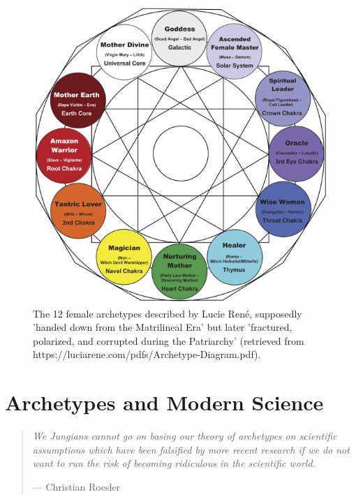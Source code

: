 \documentclass[
]{book}
\begin{document}
\begin{figure}

{\centering \includegraphics[width=\textwidth]{img/female_archetypes} 

}

\caption{The 12 female archetypes described by Lucie René, supposedly 'handed down from the Matrilineal Era' but later 'fractured, polarized, and corrupted during the Patriarchy' (retrieved from https://luciarene.com/pdfs/Archetype-Diagram.pdf).}\label{fig:unnamed-chunk-12}
\end{figure}

\hypertarget{archetypes-and-modern-science}{%
\chapter{Archetypes and Modern Science}\label{archetypes-and-modern-science}}

\begin{quote}
\emph{We Jungians cannot go on basing our theory of archetypes on scientific assumptions which have been falsified by more recent research if we do not want to run the risk of becoming ridiculous in the scientific world.}

\hfill --- Christian Roesler
\end{quote}
\end{document}

